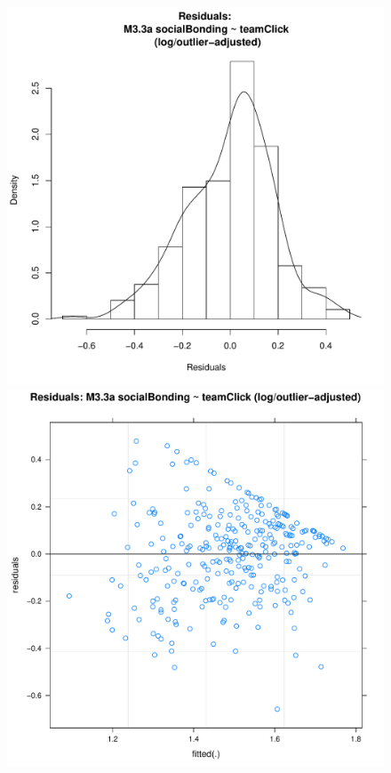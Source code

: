 \documentclass[12pt]{report}
\begin{document}
{\begin{figure}[htbp]
  \includegraphics[scale =0.4]{../images/MLM33aOutLogHist.pdf}
  \includegraphics[scale =0.4]{../images/MLM33aOutLogScatter.pdf}

\end{figure}}
\end{document}
